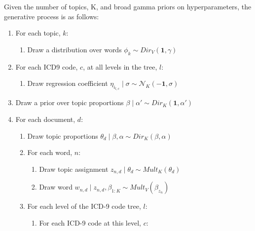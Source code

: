 \documentclass{article}
\begin{document}
Given the number of topics, K, and broad gamma priors on hyperparameters,
the generative process is as follows: 
\begin{enumerate}
\item For each topic, $k$:

\begin{enumerate}
\item Draw a distribution over words $\phi_{k}\sim Dir_{V}\left(\mathbf{1},\gamma\right)$ 
\end{enumerate}
\item For each ICD9 code, $c$, at all levels in the tree, $l$:

\begin{enumerate}
\item Draw regression coefficient $\eta_{i_{l,c}}\mid\sigma\sim\mathcal{N}_{K}\left(-\mathbf{1},\sigma\right)$ 
\end{enumerate}
\item Draw a prior over topic proportions $\beta\mid\alpha'\sim Dir_{K}\left(\mathbf{1},\alpha'\right)$ 
\item For each document, $d$:

\begin{enumerate}
\item Draw topic proportions $\theta_{d}\mid\beta,\alpha\sim Dir_{K}\left(\beta,\alpha\right)$ 
\item For each word, $n$:

\begin{enumerate}
\item Draw topic assignment $z_{n,d}\mid\theta_{d}\sim Mult_{K}\left(\theta_{d}\right)$ 
\item Draw word $w_{n,d}\mid z_{n,d},\beta_{1:K}\sim Mult_{V}\left(\beta_{z_{n}}\right)$ 
\end{enumerate}
\item For each level of the ICD-9 code tree, $l$:

\begin{enumerate}
\item For each ICD-9 code at this level, $c$:


\end{enumerate}
\end{enumerate}
\end{enumerate}
\end{document}

